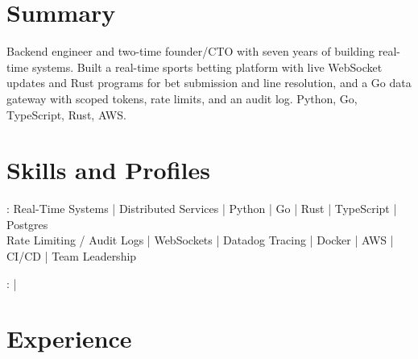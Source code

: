 \documentclass[print]{jack-resume}
\begin{document}
\pagecolor{darkmodeBackground}


\begin{minipage}[t][1cm][t]{.03\textwidth}
    \hfill
\end{minipage}

\section{Summary}
Backend engineer and two-time founder/CTO with seven years of building real-time systems. Built a real-time sports betting platform with live WebSocket updates and Rust programs for bet submission and line resolution, and a Go data gateway with scoped tokens, rate limits, and an audit log. Python, Go, TypeScript, Rust, AWS.
\sectionsep

\section{Skills and Profiles}
:
Real-Time Systems \hfill | \hfill
Distributed Services \hfill | \hfill
Python \hfill | \hfill
Go \hfill | \hfill
Rust \hfill | \hfill
TypeScript \hfill | \hfill
Postgres \\
\hspace{1.0cm} Rate Limiting / Audit Logs \hfill | \hfill
WebSockets \hfill | \hfill
Datadog Tracing \hfill | \hfill
Docker \hfill | \hfill
AWS \hfill | \hfill
CI/CD \hfill | \hfill
Team Leadership \\

\raggedright{
    :
      \href{https://www.linkedin.com/in/jack-sturtevant/}{ \ExternalLink} |
     \href{https://github.com/jacksturt}{ \ExternalLink}}

\section{Experience}
\end{document}

